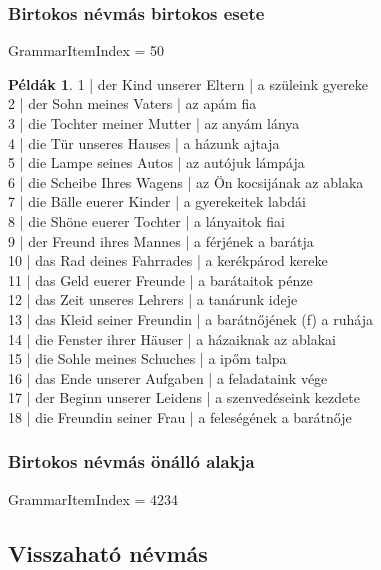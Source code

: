 \documentclass{article}
\theoremstyle{definition}
\newtheorem*{exmp}{Példák}
\begin{document}
\subsubsection{Birtokos névmás birtokos esete}

GrammarItemIndex = 50

\begin{exmp}
1 | der Kind unserer Eltern | a szüleink gyereke\\
2 | der Sohn meines Vaters | az apám fia\\
3 | die Tochter meiner Mutter | az anyám lánya\\
4 | die Tür unseres Hauses | a házunk ajtaja\\
5 | die Lampe seines Autos | az autójuk lámpája\\
6 | die Scheibe Ihres Wagens | az Ön kocsijának az ablaka\\
7 | die Bälle euerer Kinder | a gyerekeitek labdái\\
8 | die Shöne euerer Tochter | a lányaitok fiai\\
9 | der Freund ihres Mannes | a férjének a barátja\\
10 | das Rad deines Fahrrades | a kerékpárod kereke\\
11 | das Geld euerer Freunde | a barátaitok pénze\\
12 | das Zeit unseres Lehrers | a tanárunk ideje\\
13 | das Kleid seiner Freundin | a barátnőjének (f) a ruhája\\
14 | die Fenster ihrer Häuser | a házaiknak az ablakai\\
15 | die Sohle meines Schuches | a ipőm talpa\\
16 | das Ende unserer Aufgaben | a feladataink vége\\
17 | der Beginn unserer Leidens | a szenvedéseink kezdete\\
18 | die Freundin seiner Frau | a feleségének a barátnője\\
\end{exmp}

\subsubsection{Birtokos névmás önálló alakja}

GrammarItemIndex = 4234

\subsection{Visszaható névmás}
\end{document}
